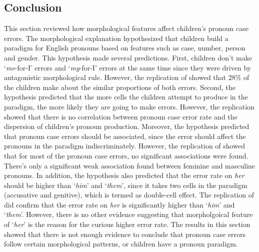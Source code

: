 \subsection{Conclusion}
This section reviewed how morphological features affect children's pronoun case errors. The morphological explanation hypothesized that children build a paradigm for English pronouns based on features such as case, number, person and gender. This hypothesis made several predictions. First, children don't make `\textit{me}-for-I' errors and `\textit{my}-for-I' errors at the same time since they were driven by antagonistic morphological rule. However, the replication of \cite{rispoli1994} showed that 28\% of the children make about the similar proportions of both errors. Second, the hypothesis predicted that the more cells the children attempt to produce in the paradigm, the more likely they are going to make errors. However, the replication \cite{rispoli2005} showed that there is no correlation between pronoun case error rate and the dispersion of children's pronoun production. Moreover, the hypothesis predicted that pronoun case errors should be associated, since the error should affect the pronouns in the paradigm indiscriminately. However, the replication of \cite{fitzgerald2017case} showed that for most of the pronoun case errors, no significant associations were found. There's only a significant weak association found between feminine and masculine pronouns. In addition, the hypothesis also predicted that the error rate on \textit{her} should be higher than `\textit{him}' and `\textit{them}', since it takes two cells in the paradigm (accusative and genitive), which is termed as double-cell effect. The replication of \cite{rispoli1998patterns} did confirm that the error rate on \textit{her} is significantly higher than `\textit{him}' and `\textit{them}'. However, there is no other evidence suggesting that morpholgoical feature of `\textit{her}' is the reason for the curious higher error rate. The results in this section showed that there is not enough evidence to conclude that pronoun case errors follow certain morphological patterns, or children have a pronoun paradigm. 